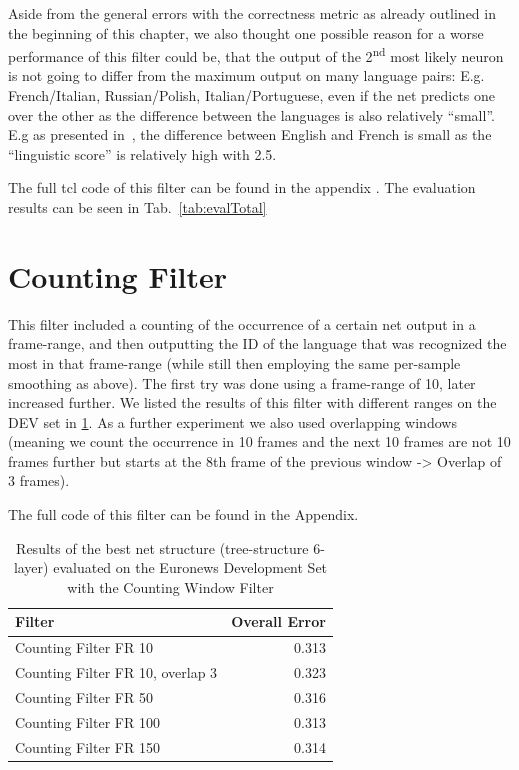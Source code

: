 Aside from the general errors with the correctness metric as already outlined in the beginning of this chapter, we also thought one possible reason for a worse performance of this filter could be, that the output of the 2\textsuperscript{nd} most likely neuron is not going to differ from the maximum output on many language pairs: E.g. French/Italian, Russian/Polish, Italian/Portuguese,  even if the net predicts one over the other as the difference between the languages is also relatively ``small''. E.g as presented in~\cite{doi:10.1080/14790710508668395}, the difference between English and French is small as the ``linguistic score'' is relatively high with 2.5. 

The full tcl code of this filter can be found in the appendix . The evaluation results can be seen in Tab.~\ref{tab:evalTotal}

\section{Counting Filter}
This filter included a counting of the occurrence of a certain net output in a frame-range, and then outputting the ID of the language that was recognized the most in that frame-range (while still then employing the same  per-sample smoothing as above). The first try was done using a frame-range of 10, later increased further. We listed the results of this filter with different ranges on the DEV set in \ref{tab:counting}. As a further experiment we also used overlapping windows (meaning we count the occurrence in 10 frames and the next 10 frames are not 10 frames further but starts at the 8th frame of the previous window -> Overlap of 3 frames).

The full code of this filter can be found in the Appendix.

\begin{table}[h!]
\caption{Results of the best net structure (tree-structure 6-layer) evaluated on the Euronews Development Set with the Counting Window Filter}
\label{tab:counting}
\centering
\begin{tabular}{| l | r |}
	\hline
	\textbf{Filter} & \textbf{Overall Error}  \\
	\hline
	Counting Filter FR 10  & 0.313 \\
	\hline
	Counting Filter FR 10, overlap 3 &  0.323\\
	\hline
	Counting Filter FR 50 & 0.316 \\
	\hline
	Counting Filter FR 100 & 0.313\\
	\hline
	Counting Filter FR 150 & 0.314\\
	\hline
\end{tabular}

\end{table}


